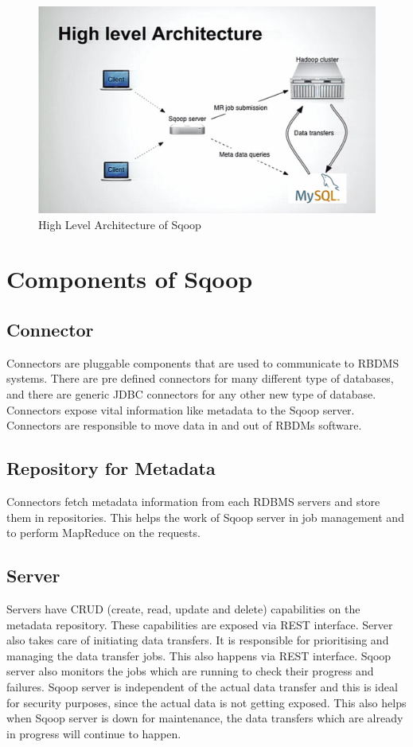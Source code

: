 \documentclass[9pt,twocolumn,twoside]{../../styles/osajnl}
\begin{document}
\begin{figure}[htbp]
\centering
\includegraphics[width=\linewidth]{images/archi.png}
\caption{High Level Architecture of Sqoop \cite{sqoop-blog}}
\label{fig:archi}
\end{figure}


\section{Components of Sqoop}
\subsection{Connector}
Connectors are pluggable components that are used to communicate to RBDMS systems. There are pre defined connectors for many different type of databases, and there are generic JDBC connectors for any other new type of database. Connectors expose vital information like metadata to the Sqoop server. Connectors are responsible to move data in and out of RBDMs software. 
\subsection{Repository for Metadata}
Connectors fetch metadata information from each RDBMS servers and store them in repositories. This helps the work of Sqoop server in job management and to perform MapReduce on the requests.
\subsection{Server}
Servers have CRUD (create, read, update and delete) capabilities on the metadata repository. These capabilities are exposed via REST interface. Server also takes care of initiating data transfers. It is responsible for prioritising and managing the data transfer jobs. This also happens via REST interface. Sqoop server also monitors the jobs which are running to check their progress and failures. Sqoop server is independent of the actual data transfer and this is ideal for security purposes, since the actual data is not getting exposed. This also helps when Sqoop server is down for maintenance, the data transfers which are already in progress will continue to happen. 
\end{document}
